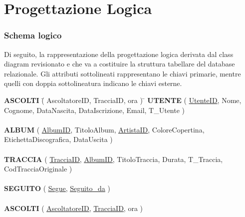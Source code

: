 \documentclass[11pt]{article}
\begin{document}
	\part{Progettazione Logica}
	\section{Schema logico}
	Di seguito, la rappresentazione della progettazione logica derivata dal class diagram
	revisionato e che va a costituire la struttura tabellare del database relazionale.
	Gli attributi sottolineati rappresentano le chiavi primarie, mentre quelli con doppia 
	sottolineatura indicano le chiavi esterne.\\
	\vspace{1cm}

	\begin{tabbing}
		\textbf{ASCOLTI} \= ( AscoltatoreID, TracciaID, ora ) \= \kill
		\textbf{UTENTE} \> ( \underline{UtenteID}, Nome, Cognome, DataNascita, DataIscrizione, Email, T\_Utente )\\\\
		\textbf{ALBUM} \> ( \underline{AlbumID}, TitoloAlbum, \underline{\underline{ArtistaID}}, ColoreCopertina, EtichettaDiscografica, DataUscita ) \\\\
		\textbf{TRACCIA} \> ( \underline{TracciaID}, \underline{\underline{AlbumID}}, TitoloTraccia, Durata, T\_Traccia, CodTracciaOriginale ) \\\\
		\textbf{SEGUITO} \> ( \underline{\underline{Segue}}, \underline{\underline{Seguito\_da}} )\\\\
		\textbf{ASCOLTI} \> ( \underline{\underline{AscoltatoreID}}, \underline{\underline{TracciaID}}, ora )
	\end{tabbing}
	
\end{document}
